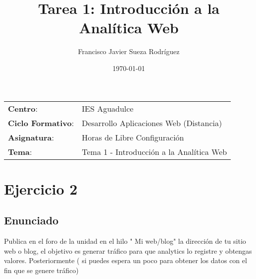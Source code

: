


\title{
\vspace{10ex}
\normalfont \normalsize
\huge \textbf{Tarea 1: Introducción a la Analítica Web}
}
\author{Francisco Javier Sueza Rodríguez}
\date{\normalsize\today}



\maketitle

\thispagestyle{empty}

\vspace{65ex}

\begin{center}
    \begin{tabular}{l l}
        \textbf{Centro}: & IES Aguadulce \\
        \textbf{Ciclo Formativo}: & Desarrollo Aplicaciones Web (Distancia)\\
        \textbf{Asignatura}: & Horas de Libre Configuración\\
        \textbf{Tema}: & Tema 1 -  Introducción a la Analítica Web\\
    \end{tabular}
\end{center}

\newpage

\tableofcontents

\vspace{30ex}

\listoffigures

\newpage

\section{Ejercicio 2}
\subsection{Enunciado}
Publica en el foro de la unidad en el hilo " Mi web/blog"  la dirección de tu sitio web o blog, el objetivo es generar tráfico para que analytics lo registre y obtengas valores. Posteriormente ( si puedes espera un poco para obtener los datos con el fin que se genere tráfico)

